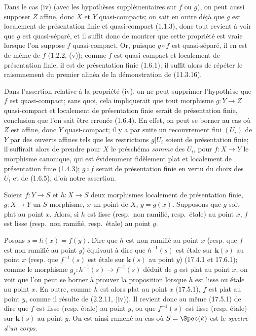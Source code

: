 Dans le cas (iv) (avec les hypothèses supplémentaires sur $f$ ou $g$), on peut aussi supposer $Z$ affine, donc $X$ et $Y$ quasi-compacts; on sait en outre déjà que $g$ est localement de présentation finie et quasi-compact (1.1.3), donc tout revient à voir que $g$ est quasi-séparé, et il suffit donc de montrer que cette propriété est vraie lorsque l'on suppose $f$ quasi-compact. Or, puisque $g\circ f$ est quasi-séparé, il en est de même de $f$ (1.2.2, (v)); comme $f$ est quasi-compact et localement de présentation finie, il est de présentation finie (1.6.1); il suffit alors de répéter le raisonnement du premier alinéa de la démonstration de (11.3.16).

\begin{remark}[17.7.6]
\label{IV.17.7.6}
Dans l'assertion relative à la propriété (iv), on ne peut supprimer l'hypothèse que $f$ est quasi-compact; sans quoi, cela impliquerait que tout morphisme $g:Y\to Z$ quasi-compact et localement de présentation finie serait de présentation finie, conclusion que l'on sait être erronée (1.6.4). En effet, on peut se borner au cas où $Z$ est affine, donc $Y$ quasi-compact; il y a par suite un recouvrement fini $(U_i)$ de $Y$ par des ouverts affines tels que les restrictions $g|U_i$ soient de présentation finie; il suffirait alors de prendre pour $X$ le préschéma \emph{somme} des $U_i$, pour $f:X\to Y$ le morphisme canonique, qui est évidemment fidèlement plat et localement de présentation finie (1.4.3); $g\circ f$ serait de présentation finie en vertu du choix des $U_i$ et de (1.6.5), d'où notre assertion.
\end{remark}

\begin{proposition}[17.7.7]
\label{IV.17.7.7}
Soient $f:Y\to S$ et $h:X\to S$ deux morphismes localement de présentation finie, $g:X\to Y$ un $S$-morphisme, $x$ un point de $X$, $y=g(x)$. Supposons que $g$ soit \textup{plat} au point $x$. Alors, si $h$ est lisse \textup{(resp.}\ non ramifié, \textup{resp.}\ étale\textup{)} au point $x$, $f$ est lisse \textup{(resp.}\ non ramifié, \textup{resp.}\ étale\textup{)} au point $y$.
\end{proposition}

Posons $s=h(x)=f(y)$. Dire que $h$ est non ramifié au point $x$ (resp. que $f$ est non ramifié au point $y$) équivaut à dire que $h^{-1}(s)$ est étale sur $\boldsymbol{k}(s)$ au point $x$ (resp. que $f^{-1}(s)$ est étale sur $\boldsymbol{k}(s)$ au point $y$) (17.4.1 et 17.6.1); comme le morphisme $g_s:h^{-1}(s)\to f^{-1}(s)$ déduit de $g$ est plat au point $x$, on voit que l'on peut se borner à prouver la proposition lorsque $h$ est lisse ou étale au point $x$. En outre, comme $h$ est alors plat au point $x$ (17.5.1), $f$ est plat au point $y$, comme il résulte de (2.2.11, (iv)). Il revient donc au même (17.5.1) de dire que $f$ est lisse (resp. étale) au point $y$, ou que $f^{-1}(s)$ est lisse (resp. étale) sur $\boldsymbol{k}(s)$ au point $y$. On est ainsi ramené au cas où $S=\Spec(k)$ est le \emph{spectre d'un corps}.

